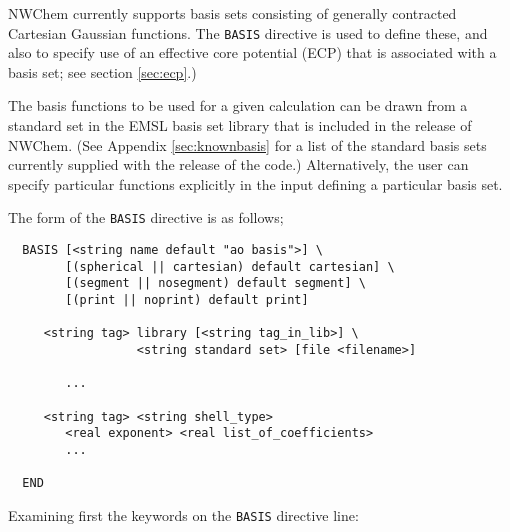 \label{sec:basis} 

NWChem currently supports basis sets consisting of generally
contracted Cartesian Gaussian functions.  The {\tt BASIS} directive is
used to define these, and also to specify use of an effective core
potential (ECP) that is associated with a basis set; see section
\ref{sec:ecp}.)

The basis functions to be used for a given calculation can be drawn
from a standard set in the EMSL basis set library that is included in
the release of NWChem.  (See Appendix \ref{sec:knownbasis} for a list
of the standard basis sets currently supplied with the release of the
code.)  Alternatively, the user can specify particular functions
explicitly in the input defining a particular basis set.

The form of the \verb+BASIS+ directive is as follows;

\begin{verbatim}
  BASIS [<string name default "ao basis">] \
        [(spherical || cartesian) default cartesian] \
        [(segment || nosegment) default segment] \
        [(print || noprint) default print]

     <string tag> library [<string tag_in_lib>] \
                  <string standard set> [file <filename>]

        ...

     <string tag> <string shell_type>
        <real exponent> <real list_of_coefficients>
        ...
     
  END
\end{verbatim}    

Examining first the keywords on the \verb+BASIS+ directive line:


